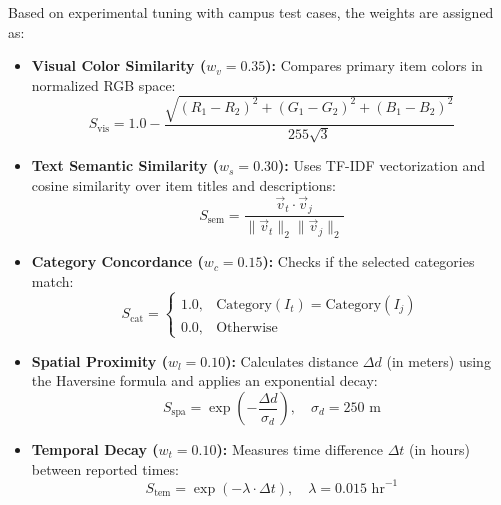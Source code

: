 \documentclass[conference]{IEEEtran}
\begin{document}
Based on experimental tuning with campus test cases, the weights are assigned as:
\begin{itemize}
    \item \textbf{Visual Color Similarity ($w_v = 0.35$):} Compares primary item colors in normalized RGB space:
    \begin{equation}
        S_{\text{vis}} = 1.0 - \frac{\sqrt{(R_1-R_2)^2 + (G_1-G_2)^2 + (B_1-B_2)^2}}{255\sqrt{3}}
    \end{equation}
    \item \textbf{Text Semantic Similarity ($w_s = 0.30$):} Uses TF-IDF vectorization and cosine similarity over item titles and descriptions:
    \begin{equation}
        S_{\text{sem}} = \frac{\vec{v}_t \cdot \vec{v}_j}{\|\vec{v}_t\|_2 \|\vec{v}_j\|_2}
    \end{equation}
    \item \textbf{Category Concordance ($w_c = 0.15$):} Checks if the selected categories match:
    \begin{equation}
        S_{\text{cat}} = \begin{cases} 1.0, & \text{Category}(I_t) = \text{Category}(I_j) \\ 0.0, & \text{Otherwise} \end{cases}
    \end{equation}
    \item \textbf{Spatial Proximity ($w_l = 0.10$):} Calculates distance $\Delta d$ (in meters) using the Haversine formula and applies an exponential decay:
    \begin{equation}
        S_{\text{spa}} = \exp\left(-\frac{\Delta d}{\sigma_d}\right), \quad \sigma_d = 250\text{ m}
    \end{equation}
    \item \textbf{Temporal Decay ($w_t = 0.10$):} Measures time difference $\Delta t$ (in hours) between reported times:
    \begin{equation}
        S_{\text{tem}} = \exp\left(-\lambda \cdot \Delta t\right), \quad \lambda = 0.015\text{ hr}^{-1}
    \end{equation}
\end{itemize}
\end{document}
